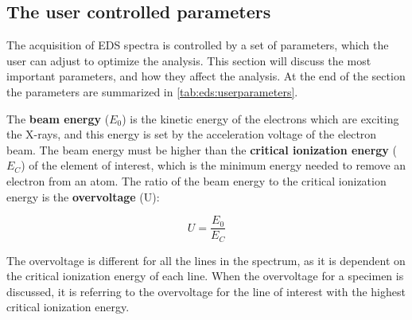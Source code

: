 \clearpage



\subsection{The user controlled parameters}
\label{theory:eds:user_controlled_parameters}

The acquisition of EDS spectra is controlled by a set of parameters, which the user can adjust to optimize the analysis.
This section will discuss the most important parameters, and how they affect the analysis.
At the end of the section the parameters are summarized in \cref{tab:eds:userparameters}.

The \textbf{beam energy} ($E_0$) is the kinetic energy of the electrons which are exciting the X-rays, and this energy is set by the acceleration voltage of the electron beam.
The beam energy must be higher than the \textbf{critical ionization energy} ($E_C$) of the element of interest, which is the minimum energy needed to remove an electron from an atom.
The ratio of the beam energy to the critical ionization energy is the \textbf{overvoltage} (U):

\begin{equation}
    U = \frac{E_0}{E_C}
\end{equation}

The overvoltage is different for all the lines in the spectrum, as it is dependent on the critical ionization energy of each line.
When the overvoltage for a specimen is discussed, it is referring to the overvoltage for the line of interest with the highest critical ionization energy.


